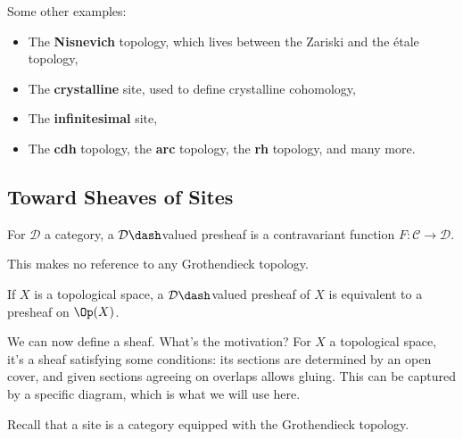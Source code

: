 \begin{example}[?]

Some other examples:

\begin{itemize}
\item
  The \textbf{Nisnevich} topology, which lives between the Zariski and
  the étale topology,
\item
  The \textbf{crystalline} site, used to define crystalline cohomology,
\item
  The \textbf{infinitesimal} site,
\item
  The \textbf{cdh} topology, the \textbf{arc} topology, the \textbf{rh}
  topology, and many more.
\end{itemize}

\end{example}

\hypertarget{toward-sheaves-of-sites}{%
\subsection{Toward Sheaves of Sites}\label{toward-sheaves-of-sites}}

\begin{definition}[Presheaf]

For \(\mathcal{D}\) a category, a \(\mathcal{D}\dash\)valued presheaf is
a contravariant function \(F:\mathcal{C}\to \mathcal{D}\).

\end{definition}

\begin{remark}

This makes no reference to any Grothendieck topology.

\end{remark}

\begin{example}[?]

If \(X\) is a topological space, a \(\mathcal{D}\dash\)valued presheaf
of \(X\) is equivalent to a presheaf on \(\Op(X)\).

\end{example}

We can now define a sheaf. What's the motivation? For \(X\) a
topological space, it's a sheaf satisfying some conditions: its sections
are determined by an open cover, and given sections agreeing on overlaps
allows gluing. This can be captured by a specific diagram, which is what
we will use here.

Recall that a site is a category equipped with the Grothendieck
topology.

